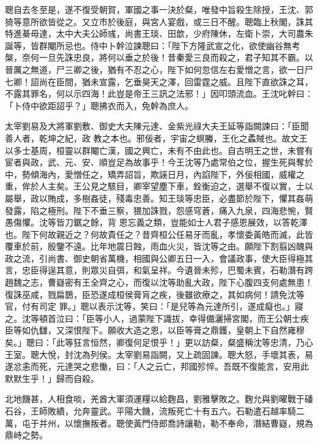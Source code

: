 \begin{pinyinscope}
 聰自去冬至是，遂不復受朝賀，軍國之事一決於粲，唯發中旨殺生除授，王沈、郭猗等意所欲皆從之。又立市於後庭，與宮人宴戲，或三日不醒。聰臨上秋閣，誅其特進綦毋達，太中大夫公師彧，尚書王琰、田歆，少府陳休，左衛卜崇，大司農朱
 誕等，皆群閹所忌也。侍中卜幹泣諫聰曰：「陛下方隆武宣之化，欲使幽谷無考槃，奈何一旦先誅忠良，將何以垂之於後！昔秦愛三良而殺之，君子知其不霸。以晉厲之無道，尸三卿之後，猶有不忍之心，陛下如何忽信左右愛憎之言，欲一日尸七卿！詔尚在臣間，猶未宣露，乞垂昊天之澤，回雷霆之威。且陛下直欲誅之耳，不露其罪名，何以示四海！此豈是帝王三訊之法邪！」因叩頭流血。王沈叱幹曰：「卜侍中欲距詔乎？」聰拂衣而入，免幹為庶人。



 太宰劉易及大將軍劉敷、御史大夫陳元達、金紫光祿大夫王延等詣闕諫曰：「臣聞善人者，乾坤之紀，政
 教之本也。邪佞者，宇宙之螟螣，王化之蟊賊也。故文王以多士基周，桓靈以群閹亡漢，國之興亡，未有不由此也。自古明王之世，未嘗有宦者與政，武、元、安、順豈足為故事乎！今王沈等乃處常伯之位，握生死與奪於中，勢傾海內，愛憎任之，矯弄詔旨，欺誣日月，內諂陛下，外佞相國，威權之重，侔於人主矣。王公見之駭目，卿宰望塵下車，銓衡迫之，選舉不復以實，士以屬舉，政以賄成，多樹姦徒，殘毒忠善。知王琰等忠臣，必盡節於陛下，懼其姦萌發露，陷之極刑。陛下不垂三察，猥加誅戮，怨感穹蒼，痛入九泉，四海悲惋，賢愚傷懼。沈等皆刀鋸之餘，背
 恩忘義之類，豈能如士人君子感恩展效，以答乾澤也。陛下何故親近之？何故貴任之？昔齊桓公任易牙而亂，孝懷委黃皓而滅，此皆覆車於前，殷鑒不遠。比年地震日蝕，雨血火災，皆沈等之由。願陛下割翦凶醜與政之流，引尚書、御史朝省萬機，相國與公卿五日一入，會議政事，使大臣得極其言，忠臣得逞其意，則眾災自弭，和氣呈祥。今遺晉未殄，巴蜀未賓，石勒潛有跨趙魏之志，曹嶷密有王全齊之心，而復以沈等助亂大政，陛下心腹四支何處無患！復誅巫咸，戮扁鵲，臣恐遂成桓侯膏肓之疾，後雖欲療之，其如病何！請免沈等官，付有司定
 罪。」聰以表示沈等，笑曰：「是兒等為元達所引，遂成癡也。」寢之。沈等頓首泣曰：「臣等小人，過蒙陛下識拔，幸得備灑掃宮閣，而王公朝士疾臣等如仇讎，又深恨陛下。願收大造之恩，以臣等膏之鼎鑊，皇朝上下自然雍穆矣。」聰曰：「此等狂言恒然，卿復何足恨乎！」更以訪粲，粲盛稱沈等忠清，乃心王室。聰大悅，封沈為列侯。太宰劉易詣闕，又上疏固諫。聰大怒，手壞其表，易遂忿恚而死，元達哭之悲慟，曰：「人之云亡，邦國殄悴。吾既不復能言，安用此默默生乎！」歸而自殺。



 北地饑甚，人相食啖，羌酋大軍須運糧以給麴昌，劉雅擊敗之。麴允與劉曜戰于磻
 石谷，王師敗績，允奔靈武。平陽大饑，流叛死亡十有五六。石勒遣石越率騎二萬，屯于并州，以懷撫叛者。聰使黃門侍郎喬詩讓勒，勒不奉命，潛結曹嶷，規為鼎峙之勢。




\end{pinyinscope}
